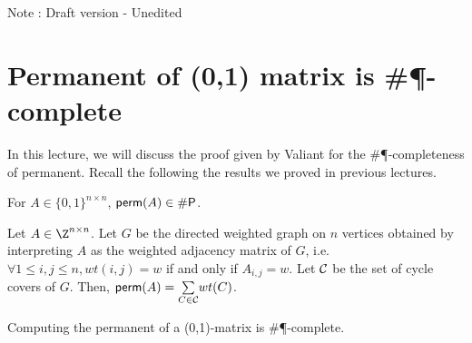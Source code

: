 \documentclass[11pt]{article}
\newcommand{\perm}{{\sf perm}}
\begin{document}
{\sc Note : Draft version - Unedited}

\section{Permanent of (0,1) matrix is \#\P-complete}
    In this lecture, we will discuss the proof given by Valiant for the \#\P-completeness of permanent. Recall the following the results we proved in previous lectures.
    \begin{lemma}
        For $A \in \{0,1\}^{n \times n}$, $\perm(A) \in \#\P$.
    \end{lemma}
    \begin{lemma}
        Let $A \in \Z^{n \times n}$. Let $G$ be the directed weighted graph on $n$ vertices obtained by interpreting $A$ as the weighted adjacency matrix of $G$, i.e. $\forall 1 \le i,j \le n, wt(i, j) = w$ if and only if $A_{i,j} = w$. Let $\cal C$ be the set of cycle covers of $G$. Then, $\perm(A) = \underset{C \in \cal C}\sum wt(C)$. 
    \end{lemma}
    \begin{theorem}
        Computing the permanent of a (0,1)-matrix is \#\P-complete.
    \end{theorem}
\end{document}
